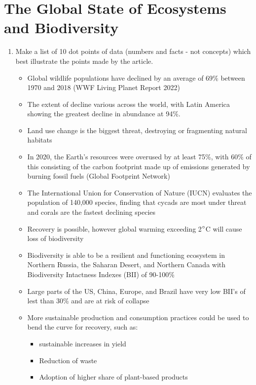 \section{The Global State of Ecosystems and Biodiversity} \label{19/05/2025}
	\begin{enumerate}
		\item Make a list of 10 dot points of data (numbers and facts - not concepts) which best illustrate the points made by the article. 
			\begin{itemize}
				\item Global wildlife populations have declined by an average of 69\% between 1970 and 2018 (WWF Living Planet Report 2022)
				\item The extent of decline various across the world, with Latin America showing the greatest decline in abundance at 94\%.
					\item Land use change is the biggest threat, destroying or fragmenting natural habitats
				\item In 2020, the Earth's resources were overused by at least 75\%, with 60\% of this consisting of the carbon footprint made up of emissions generated by burning fossil fuels (Global Footprint Network)
				\item The International Union for Conservation of Nature (IUCN) evaluates the population of 140,000 species, finding that cycads are most under threat and corals are the fastest declining species
				\item Recovery is possible, however global warming exceeding 2$\degree$C will cause loss of biodiversity 
				\item Biodiversity is able to be a resilient and functioning ecosystem in Northern Russia, the Saharan Desert, and Northern Canada with Biodiversity Intactness Indexes (BII) of 90-100\%
				\item Large parts of the US, China, Europe, and Brazil have very low BII's of lest than 30\% and are at risk of collapse
				\item More sustainable production and consumption practices could be used to bend the curve for recovery, such as:
					\begin{itemize}
						\item sustainable increases in yield
						\item Reduction of waste
						\item Adoption of higher share of plant-based products
					\end{itemize}
			\end{itemize}

\end{enumerate}
